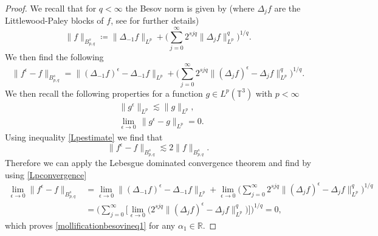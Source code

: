 \documentclass[12pt,a4paper]{article}
\theoremstyle{definition}
\theoremstyle{remark}
\numberwithin{equation}{section}
\begin{document}
\begin{appendices}
\begin{proof}
We recall that for $q < \infty$ the Besov norm is given by (where $\Delta_j f$ are the Littlewood-Paley blocks of $f$, see \cite{bahouri,boutroshydrostatic} for further details)
\begin{equation*}
\lVert f \rVert_{B^{s}_{p,q}} \coloneqq \lVert \Delta_{-1} f \rVert_{L^p} + \bigg( \sum_{j=0}^\infty 2^{s j q} \lVert \Delta_j f \rVert_{L^p}^q \bigg)^{1/q}.
\end{equation*}
We then find the following
\begin{equation*}
\lVert f^\epsilon - f \rVert_{B^{s}_{p,q}} = \lVert (\Delta_{-1} f)^\epsilon - \Delta_{-1} f \rVert_{L^p} + \bigg( \sum_{j=0}^\infty 2^{s j q} \lVert (\Delta_j f)^\epsilon - \Delta_j f \rVert_{L^p}^q \bigg)^{1/q}.
\end{equation*}
We then recall the following properties for a function $g \in L^p (\mathbb{T}^3)$ with $p < \infty$
\begin{align}
&\lVert g^\epsilon \rVert_{L^p} \lesssim \lVert g \rVert_{L^p}, \label{Lpestimate} \\
&\lim_{\epsilon \rightarrow 0} \, \lVert g^\epsilon - g \rVert_{L^p} = 0. \label{Lpconvergence}
\end{align}
Using inequality \eqref{Lpestimate} we find that
\begin{equation*}
\lVert f^\epsilon - f \rVert_{B^{s}_{p,q}} \lesssim 2 \lVert f \rVert_{B^s_{p,q}}.
\end{equation*}
Therefore we can apply the Lebesgue dominated convergence theorem and find by using \eqref{Lpconvergence}
\begin{align*}
\lim_{\epsilon \rightarrow 0} \lVert f^\epsilon - f \rVert_{B^{s}_{p,q}} &= \lim_{\epsilon \rightarrow 0} \lVert (\Delta_{-1} f)^\epsilon - \Delta_{-1} f \rVert_{L^p} + \lim_{\epsilon \rightarrow 0} \bigg( \sum_{j=0}^\infty 2^{s j q} \lVert (\Delta_j f)^\epsilon - \Delta_j f \rVert_{L^p}^q \bigg)^{1/q} \\
&= \bigg( \sum_{j=0}^\infty \big[ \lim_{\epsilon \rightarrow 0} \big(2^{s j q} \lVert (\Delta_j f)^\epsilon - \Delta_j f \rVert_{L^p}^q \big) \big] \bigg)^{1/q} = 0,
\end{align*}
which proves \eqref{mollificationbesovineq1} for any $\alpha_1 \in \mathbb{R}$.


\end{proof}
\end{appendices}
\end{document}

